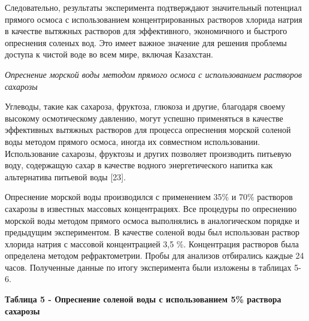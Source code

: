 Следовательно, результаты эксперимента подтверждают значительный
потенциал прямого осмоса с использованием концентрированных растворов
хлорида натрия в качестве вытяжных растворов для эффективного,
экономичного и быстрого опреснения соленых вод. Это имеет важное
значение для решения проблемы доступа к чистой воде во всем мире,
включая Казахстан.

\emph{Опреснение морской воды методом прямого осмоса с использованием
растворов сахарозы}

Углеводы, такие как сахароза, фруктоза, глюкоза и другие, благодаря
своему высокому осмотическому давлению, могут успешно применяться в
качестве эффективных вытяжных растворов для процесса опреснения морской
соленой воды методом прямого осмоса, иногда их совместном использовании.
Использование сахарозы, фруктозы и других позволяет производить питьевую
воду, содержащую сахар в качестве водного энергетического напитка как
альтернатива питьевой воды {[}23{]}.

Опреснение морской воды производился с применением 35\% и 70\% растворов
сахарозы в известных массовых концентрациях. Все процедуры по опреснению
морской воды методом прямого осмоса выполнялись в аналогическом порядке
и предыдущим экспериментом. В качестве соленой воды был использован
раствор хлорида натрия с массовой концентрацией 3,5 \%. Концентрация
растворов была определена методом рефрактометрии. Пробы для анализов
отбирались каждые 24 часов. Полученные данные по итогу эксперимента были
изложены в таблицах 5-6.

{\bfseries Таблица 5 - Опреснение соленой воды с использованием 5\%
раствора сахарозы}

